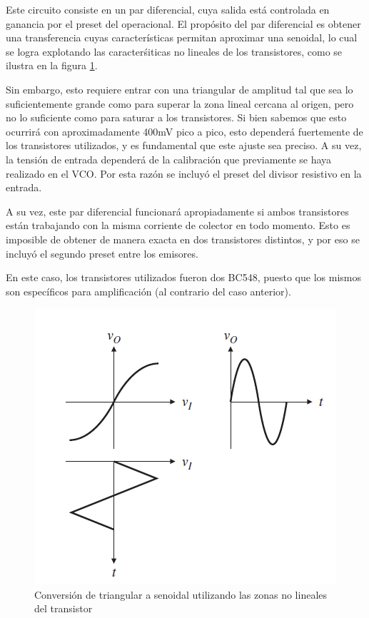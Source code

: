 \documentclass[../../tc_tp6_main.tex]{subfiles}
\begin{document}
Este circuito consiste en un par diferencial, cuya salida est\'a controlada en ganancia por el preset del operacional. El prop\'osito del par diferencial es obtener una transferencia cuyas caracter\'isticas permitan aproximar una senoidal, lo cual se logra explotando las caracter\'siticas no lineales de los transistores, como se ilustra en la figura \ref{fig:curvatransistor}.\par

Sin embargo, esto requiere entrar con una triangular de amplitud tal que sea lo suficientemente grande como para superar la zona lineal cercana al origen, pero no lo suficiente como para saturar a los transistores. Si bien sabemos que esto ocurrir\'a con aproximadamente 400mV pico a pico, esto depender\'a fuertemente de los transistores utilizados, y es fundamental que este ajuste sea preciso. A su vez, la tensi\'on de entrada depender\'a de la calibraci\'on que previamente se haya realizado en el VCO. Por esta raz\'on se incluy\'o el preset del divisor resistivo en la entrada. \par

A su vez, este par diferencial funcionar\'a apropiadamente si ambos transistores est\'an trabajando con la misma corriente de colector en todo momento. Esto es imposible de obtener de manera exacta en dos transistores distintos, y por eso se incluy\'o el segundo preset entre los emisores. \par

En este caso, los transistores utilizados fueron dos BC548, puesto que los mismos son espec\'ificos para amplificaci\'on (al contrario del caso anterior).\par 

\begin{figure}[H]
	\centering
	\includegraphics[scale=0.8]{imagenes/triang-sin.png}
	\caption{Conversi\'on de triangular a senoidal utilizando las zonas no lineales del transistor}
	\label{fig:curvatransistor}
\end{figure}
\end{document}
